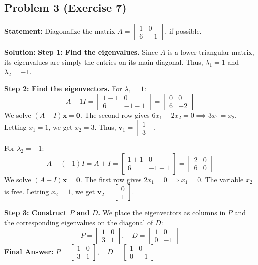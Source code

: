 \documentclass[11pt, a4paper]{article}
\theoremstyle{definition}
\theoremstyle{remark}
\begin{document}
\subsection{Problem 3 (Exercise 7)}
\textbf{Statement:} Diagonalize the matrix $A = \begin{bmatrix} 1 & 0 \\ 6 & -1 \end{bmatrix}$, if possible.

\textbf{Solution:}
\textbf{Step 1: Find the eigenvalues.}
Since $A$ is a lower triangular matrix, its eigenvalues are simply the entries on its main diagonal. Thus, $\lambda_1 = 1$ and $\lambda_2 = -1$.

\textbf{Step 2: Find the eigenvectors.}
For $\lambda_1 = 1$:
\[
A - 1I = \begin{bmatrix} 1-1 & 0 \\ 6 & -1-1 \end{bmatrix} = \begin{bmatrix} 0 & 0 \\ 6 & -2 \end{bmatrix}
\]
We solve $(A - I)\mathbf{x} = \mathbf{0}$. The second row gives $6x_1 - 2x_2 = 0 \implies 3x_1 = x_2$. Letting $x_1 = 1$, we get $x_2 = 3$. Thus, $\mathbf{v}_1 = \begin{bmatrix} 1 \\ 3 \end{bmatrix}$.

For $\lambda_2 = -1$:
\[
A - (-1)I = A + I = \begin{bmatrix} 1+1 & 0 \\ 6 & -1+1 \end{bmatrix} = \begin{bmatrix} 2 & 0 \\ 6 & 0 \end{bmatrix}
\]
We solve $(A + I)\mathbf{x} = \mathbf{0}$. The first row gives $2x_1 = 0 \implies x_1 = 0$. The variable $x_2$ is free. Letting $x_2 = 1$, we get $\mathbf{v}_2 = \begin{bmatrix} 0 \\ 1 \end{bmatrix}$.

\textbf{Step 3: Construct $P$ and $D$.}
We place the eigenvectors as columns in $P$ and the corresponding eigenvalues on the diagonal of $D$:
\[
P = \begin{bmatrix} 1 & 0 \\ 3 & 1 \end{bmatrix}, \quad D = \begin{bmatrix} 1 & 0 \\ 0 & -1 \end{bmatrix}
\]
\textbf{Final Answer:} $\displaystyle P = \begin{bmatrix} 1 & 0 \\ 3 & 1 \end{bmatrix}, \quad D = \begin{bmatrix} 1 & 0 \\ 0 & -1 \end{bmatrix}$
\end{document}
